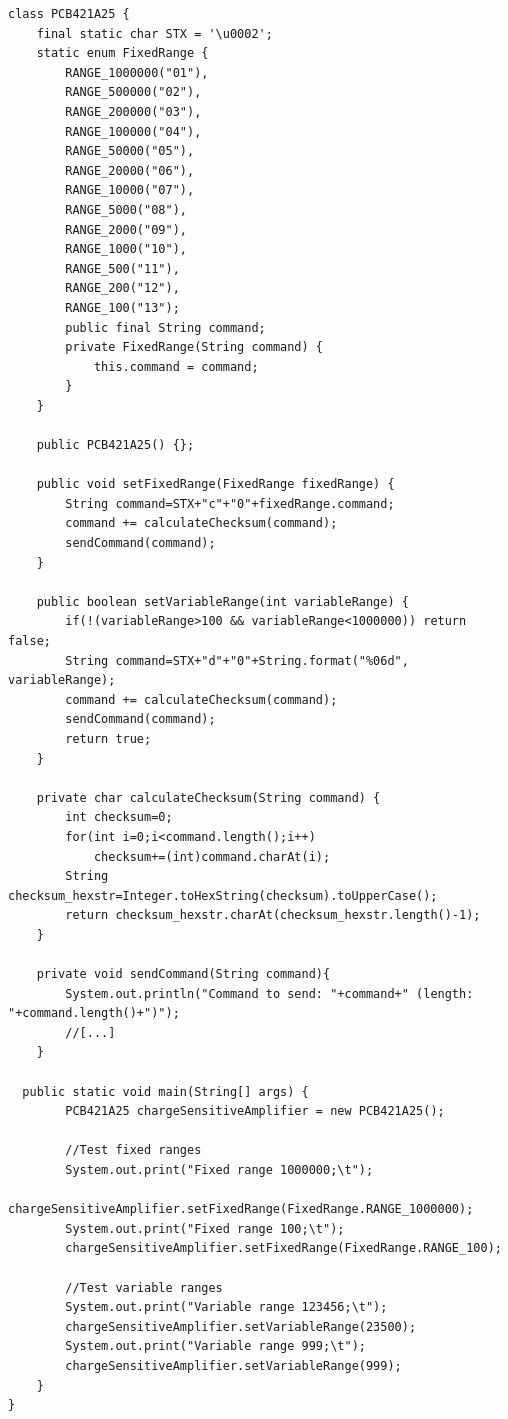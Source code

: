 \FloatBarrier
\begin{lstlisting}[style=java,caption = Java class of the PCB421A25 charge amplifier demonstrating the command structure and checksum calculation for integration of the amplifier into \gls{css}, label = lst:Appendix-javaPcb]
class PCB421A25 {
	final static char STX = '\u0002';	
	static enum FixedRange {
		RANGE_1000000("01"), 
		RANGE_500000("02"),
		RANGE_200000("03"),
		RANGE_100000("04"),
		RANGE_50000("05"),
		RANGE_20000("06"),
		RANGE_10000("07"),
		RANGE_5000("08"),
		RANGE_2000("09"),
		RANGE_1000("10"),
		RANGE_500("11"),
		RANGE_200("12"),
		RANGE_100("13");
		public final String command;
		private FixedRange(String command) {
			this.command = command;
		}
	}
	
	public PCB421A25() {};
	
	public void setFixedRange(FixedRange fixedRange) {
		String command=STX+"c"+"0"+fixedRange.command;
		command += calculateChecksum(command);
		sendCommand(command);
	}
	
	public boolean setVariableRange(int variableRange) {
		if(!(variableRange>100 && variableRange<1000000)) return false;
		String command=STX+"d"+"0"+String.format("%06d", variableRange);
		command += calculateChecksum(command);
		sendCommand(command);
		return true;
	}
	
	private char calculateChecksum(String command) {
		int checksum=0;
		for(int i=0;i<command.length();i++)
			checksum+=(int)command.charAt(i);
		String checksum_hexstr=Integer.toHexString(checksum).toUpperCase();
		return checksum_hexstr.charAt(checksum_hexstr.length()-1);
	}
	
	private void sendCommand(String command){
		System.out.println("Command to send: "+command+" (length: "+command.length()+")");
		//[...]
	}
	
  public static void main(String[] args) {
		PCB421A25 chargeSensitiveAmplifier = new PCB421A25();
		
		//Test fixed ranges
		System.out.print("Fixed range 1000000;\t");
		chargeSensitiveAmplifier.setFixedRange(FixedRange.RANGE_1000000);
        System.out.print("Fixed range 100;\t");
        chargeSensitiveAmplifier.setFixedRange(FixedRange.RANGE_100);
        
        //Test variable ranges
		System.out.print("Variable range 123456;\t");
		chargeSensitiveAmplifier.setVariableRange(23500);
		System.out.print("Variable range 999;\t");
		chargeSensitiveAmplifier.setVariableRange(999);
    }
}
\end{lstlisting}